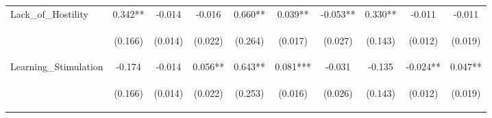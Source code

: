 \begin{tabular}{lccccccccc}
\noalign{\smallskip}Lack_of_Hostility & 0.342** & -0.014 & -0.016 & 0.660** & 0.039** & -0.053** & 0.330** & -0.011 & -0.011\\
 & \begin{footnotesize}(0.166)\end{footnotesize} & \begin{footnotesize}(0.014)\end{footnotesize} & \begin{footnotesize}(0.022)\end{footnotesize} & \begin{footnotesize}(0.264)\end{footnotesize} & \begin{footnotesize}(0.017)\end{footnotesize} & \begin{footnotesize}(0.027)\end{footnotesize} & \begin{footnotesize}(0.143)\end{footnotesize} & \begin{footnotesize}(0.012)\end{footnotesize} & \begin{footnotesize}(0.019)\end{footnotesize}\\
\noalign{\smallskip}Learning_Stimulation & -0.174 & -0.014 & 0.056** & 0.643** & 0.081*** & -0.031 & -0.135 & -0.024** & 0.047**\\
 & \begin{footnotesize}(0.166)\end{footnotesize} & \begin{footnotesize}(0.014)\end{footnotesize} & \begin{footnotesize}(0.022)\end{footnotesize} & \begin{footnotesize}(0.253)\end{footnotesize} & \begin{footnotesize}(0.016)\end{footnotesize} & \begin{footnotesize}(0.026)\end{footnotesize} & \begin{footnotesize}(0.143)\end{footnotesize} & \begin{footnotesize}(0.012)\end{footnotesize} & \begin{footnotesize}(0.019)\end{footnotesize}\\

\end{tabular}
